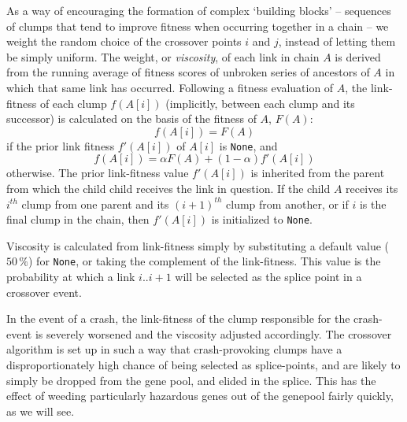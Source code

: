 As a way of encouraging the formation of complex `building
blocks' -- sequences of clumps that tend to improve fitness when
occurring together in a chain -- we weight the random choice of
the crossover points $i$ and $j$, instead of letting them be
simply uniform. The weight, or \emph{viscosity}, of each
link in chain $A$ is derived from the running average of fitness
scores of unbroken series of ancestors of $A$ in which that same link
has occurred. Following a fitness evaluation of $A$, the
link-fitness of each clump $f(A[i])$ (implicitly, between each
clump and its successor) is calculated on the basis of the
fitness of $A$, $F(A)$: 
  $$ f(A[i]) = F(A)$$
if the prior link fitness $f'(A[i])$ of $A[i]$ is \texttt{None},
and 
  $$ f(A[i]) = \alpha F(A) + (1-\alpha) f'(A[i]) $$
otherwise. The prior link-fitness value $f'(A[i])$ is inherited
from the parent from which the child child receives the link in
question. If the child $A$ receives its $i^{th}$ clump from one
parent and its $(i+1)^{th}$ clump from another, or if $i$ is the
final clump in the chain, then $f'(A[i])$ is initialized to
\texttt{None}.

Viscosity is calculated from link-fitness simply by substituting
a default value ($50\,\%$) for \texttt{None}, or taking the
complement of the link-fitness. This value is the probability at
which a link $i..i+1$ will be selected as the splice point in a
crossover event. 

In the event of a crash, the link-fitness of the clump
responsible for the crash-event is severely worsened
and the viscosity adjusted accordingly. The crossover algorithm
is set up in such a way that crash-provoking clumps have a
disproportionately high chance of being selected as
splice-points, and are likely to simply be dropped from the gene
pool, and elided in the splice. This has the effect of weeding
particularly hazardous genes out of the genepool fairly quickly,
as we will see. 






